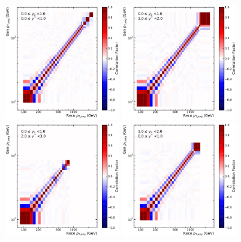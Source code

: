 \begin{figure}[htbp]
    \centering
    \includegraphics[width=0.45\textwidth]{figures/measurement/unf_nlo_corr_yb0ys0.pdf}\hfill
    \includegraphics[width=0.45\textwidth]{figures/measurement/unf_nlo_corr_yb0ys1.pdf}
    \includegraphics[width=0.45\textwidth]{figures/measurement/unf_nlo_corr_yb0ys2.pdf}\hfill
    \includegraphics[width=0.45\textwidth]{figures/measurement/unf_nlo_corr_yb1ys0.pdf}

\end{figure}
